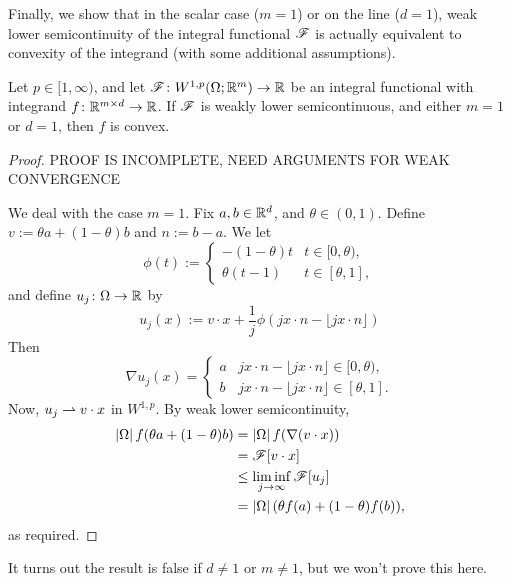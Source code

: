 Finally, we show that in the scalar case ($m=1$) or on the line ($d=1$), weak lower semicontinuity of the integral functional $\mathscr{F}$ is actually equivalent to convexity of the integrand (with some additional assumptions).
\begin{proposition} \label{prop:wlscImpliesConvex}
    Let $p \in [1,\infty)$, and let $\mathscr{F} \colon W^{1,p}(\Omega;\mathbb{R}^m) \to \mathbb{R}$ be an integral functional with integrand $f \colon \mathbb{R}^{m \times d} \to \mathbb{R}$. If $\mathscr{F}$ is weakly lower semicontinuous, and either $m=1$ or $d=1$, then $f$ is convex.
\end{proposition}
\begin{proof}
    PROOF IS INCOMPLETE, NEED ARGUMENTS FOR WEAK CONVERGENCE

    We deal with the case $m=1$. Fix $a,b \in \mathbb{R}^d$, and $\theta \in (0,1)$. Define $v := \theta a + (1-\theta) b$ and $n := b - a$. We let 
    \begin{equation}
        \phi(t) :=
        \begin{cases}
            -(1-\theta)t & t \in [0,\theta), \\
            \theta(t-1)  & t \in [\theta,1], 
        \end{cases}
    \end{equation}
    and define $u_j \colon \Omega \to \mathbb{R}$ by 
    \begin{equation} \label{eq:definitionOfSequenceForWeakLSCImpliesConvexity}
        u_j(x) := v \cdot x + \frac{1}{j}\phi(jx \cdot n - \lfloor jx \cdot n \rfloor)
    \end{equation}
    Then 
    \begin{equation}
        \nabla u_j(x) = 
        \begin{cases}
            a & jx \cdot n - \lfloor jx \cdot n \rfloor \in [0,\theta), \\
            b & jx \cdot n - \lfloor jx \cdot n \rfloor \in [\theta,1].
        \end{cases}
    \end{equation}
    Now, $u_j \rightharpoonup v \cdot x$ in $W^{1,p}$. By weak lower semicontinuity,
    \begin{equation} \begin{aligned}
        \left\lvert {\Omega} \right\rvert f(\theta a + (1-\theta)b) &= \left\lvert {\Omega} \right\rvert f(\nabla(v \cdot x))            \\
                                              &= \mathscr{F}[v \cdot x]                            \\
                                              &\leq \liminf_{j \to \infty} \mathscr{F}[u_j]        \\
                                              &= \left\lvert {\Omega} \right\rvert(\theta f(a) + (1-\theta) f(b)),
    \end{aligned} \end{equation}
    as required.
\end{proof}
It turns out the result is false if $d \neq 1$ or $m \neq 1$, but we won't prove this here.

